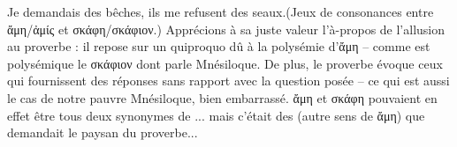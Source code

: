 {{Je demandais des bêches, ils me refusent des seaux.}(Jeux de consonances entre ἄμη/ἀμίς et σκάφη/σκάφιον.)
Apprécions à sa juste valeur l'à-propos de l'allusion au proverbe : il repose sur un quiproquo dû à la polysémie d'ἄμη -- comme est polysémique le σκάφιον dont parle Mnésiloque. De plus, le proverbe évoque ceux qui fournissent des réponses sans rapport avec la question posée -- ce qui est aussi le cas de notre pauvre Mnésiloque, bien embarrassé.
ἄμη et σκάφη pouvaient en effet être tous deux synonymes de ... mais c'était des  (autre sens de ἄμη) que demandait le paysan du proverbe...}
